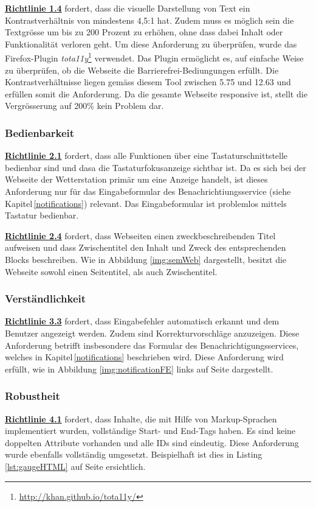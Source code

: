 \noindent
\href{https://www.w3.org/Translations/WCAG20-de/#visual-audio-contrast}{\textbf{Richtlinie 1.4}} fordert, dass die visuelle Darstellung von Text ein Kontrastverhältnis von mindestens 4,5:1 hat. Zudem muss es möglich sein die Textgrösse um bis zu 200 Prozent zu erhöhen, ohne dass dabei Inhalt oder Funktionalität verloren geht. Um diese Anforderung zu überprüfen, wurde das Firefox-Plugin \textit{tota11y}\footnote{\url{http://khan.github.io/tota11y/}} verwendet. Das Plugin ermöglicht es, auf einfache Weise zu überprüfen, ob die Webseite die Barrierefrei-Bediungungen erfüllt. Die Kontrastverhältnisse liegen gemäss diesem Tool zwischen 5.75 und 12.63 und erfüllen somit die Anforderung. Da die gesamte Webseite responsive ist, stellt die Vergrösserung auf 200\% kein Problem dar.


\subsubsection{Bedienbarkeit}
\href{https://www.w3.org/Translations/WCAG20-de/#keyboard-operation}{\textbf{Richtlinie 2.1}} fordert, dass alle Funktionen über eine Tastaturschnittstelle bedienbar sind und dasa die Tastaturfokusanzeige sichtbar ist.
Da es sich bei der Webseite der Wetterstation primär um eine Anzeige handelt, ist dieses Anforderung nur für das Eingabeformular des Benachrichtiungsservice (siehe Kapitel\,\ref{notifications}) relevant. Das Eingabeformular ist problemlos mittels Tastatur bedienbar.\newline

\noindent
\href{https://www.w3.org/Translations/WCAG20-de/#navigation-mechanisms}{\textbf{Richtlinie 2.4}} fordert, dass Webseiten einen zweckbeschreibenden Titel aufweisen und dass Zwischentitel den Inhalt und Zweck des entsprechenden Blocks beschreiben. Wie in Abbildung \ref{img:semWeb} dargestellt, besitzt die Webseite sowohl einen Seitentitel, als auch Zwischentitel.


\subsubsection{Verständlichkeit}
\href{https://www.w3.org/Translations/WCAG20-de/#minimize-error}{\textbf{Richtlinie 3.3}} fordert, dass Eingabefehler automatisch erkannt und dem Benutzer angezeigt werden. Zudem sind Korrekturvorschläge anzuzeigen. Diese Anforderung betrifft insbesondere das Formular des Benachrichtigungsservices, welches in Kapitel\,\ref{notifications} beschrieben wird. Diese Anforderung wird erfüllt, wie in Abbildung \ref{img:notificationFE} links auf Seite \pageref{img:notificationFE} dargestellt.


\subsubsection{Robustheit}
\href{https://www.w3.org/Translations/WCAG20-de/#ensure-compat}{\textbf{Richtlinie 4.1}} fordert, dass Inhalte, die mit Hilfe von Markup-Sprachen implementiert wurden,  vollständige Start- und End-Tags haben. Es sind keine doppelten Attribute vorhanden und alle IDs sind eindeutig. Diese Anforderung wurde ebenfalls vollständig umgesetzt. Beispielhaft ist dies in Listing \ref{lst:gaugeHTML} auf Seite \pageref{lst:gaugeHTML} ersichtlich.
